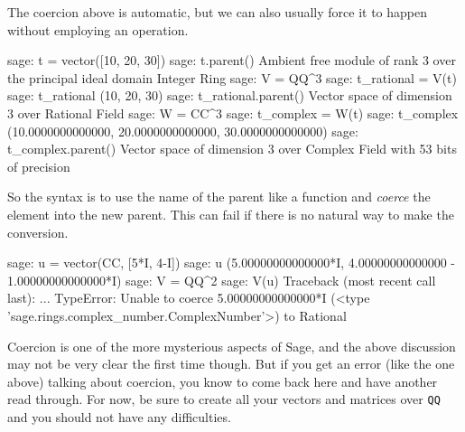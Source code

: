 %
The coercion above is automatic, but we can also usually force it to happen without employing an operation.
%
\begin{sageexample}
sage: t = vector([10, 20, 30])
sage: t.parent()
Ambient free module of rank 3 over
the principal ideal domain Integer Ring
sage: V = QQ^3
sage: t_rational = V(t)
sage: t_rational
(10, 20, 30)
sage: t_rational.parent()
Vector space of dimension 3 over Rational Field
sage: W = CC^3
sage: t_complex = W(t)
sage: t_complex
(10.0000000000000, 20.0000000000000, 30.0000000000000)
sage: t_complex.parent()
Vector space of dimension 3 over
Complex Field with 53 bits of precision
\end{sageexample}
%
So the syntax is to use the name of the parent like a function and \emph{coerce} the element into the new parent.  This can fail if there is no natural way to make the conversion.
%
\begin{sageexample}
sage: u = vector(CC, [5*I, 4-I])
sage: u
(5.00000000000000*I, 4.00000000000000 - 1.00000000000000*I)
sage: V = QQ^2
sage: V(u)
Traceback (most recent call last):
...
TypeError: Unable to coerce 5.00000000000000*I
(<type 'sage.rings.complex_number.ComplexNumber'>) to Rational
\end{sageexample}
%
Coercion is one of the more mysterious aspects of Sage, and the above discussion may not be very clear the first time though.  But if you get an error (like the one above) talking about coercion, you know to come back here and have another read through.  For now, be sure to create all your vectors and matrices over \verb?QQ? and you should not have any difficulties.
%
\begin{sageverbatim}
\end{sageverbatim}
%
